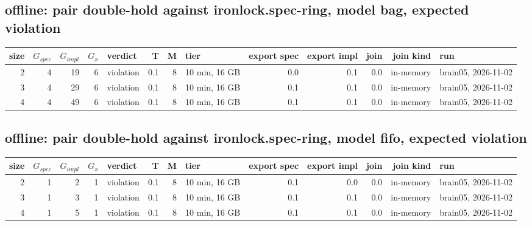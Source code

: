 \documentclass[10pt]{article}
\begin{document}
\subsection*{offline: pair \textsf{double-hold} against \textsf{ironlock.spec-ring}, model bag, expected violation}
\begin{longtable}{@{}rrrrlrrlrrrrl@{}}
\toprule
size & $G_{\mathit{spec}}$ & $G_{\mathit{impl}}$ & $G_x$ & verdict & T & M & tier & export spec & export impl & join & join kind & run \\
\midrule
\endhead
\color{red} 2 & 4 & 19 & 6 & violation & 0.1 & 8 & 10 min, 16 GB & 0.0 & 0.1 & 0.0 & in-memory & brain05, 2026-11-02 \\
\color{red} 3 & 4 & 29 & 6 & violation & 0.1 & 8 & 10 min, 16 GB & 0.1 & 0.1 & 0.0 & in-memory & brain05, 2026-11-02 \\
\color{red} 4 & 4 & 49 & 6 & violation & 0.1 & 8 & 10 min, 16 GB & 0.1 & 0.1 & 0.0 & in-memory & brain05, 2026-11-02 \\
\bottomrule
\end{longtable}
\subsection*{offline: pair \textsf{double-hold} against \textsf{ironlock.spec-ring}, model fifo, expected violation}
\begin{longtable}{@{}rrrrlrrlrrrrl@{}}
\toprule
size & $G_{\mathit{spec}}$ & $G_{\mathit{impl}}$ & $G_x$ & verdict & T & M & tier & export spec & export impl & join & join kind & run \\
\midrule
\endhead
\color{red} 2 & 1 & 2 & 1 & violation & 0.1 & 8 & 10 min, 16 GB & 0.1 & 0.0 & 0.0 & in-memory & brain05, 2026-11-02 \\
\color{red} 3 & 1 & 3 & 1 & violation & 0.1 & 8 & 10 min, 16 GB & 0.1 & 0.1 & 0.0 & in-memory & brain05, 2026-11-02 \\
\color{red} 4 & 1 & 5 & 1 & violation & 0.1 & 8 & 10 min, 16 GB & 0.1 & 0.1 & 0.0 & in-memory & brain05, 2026-11-02 \\
\bottomrule
\end{longtable}
\end{document}
